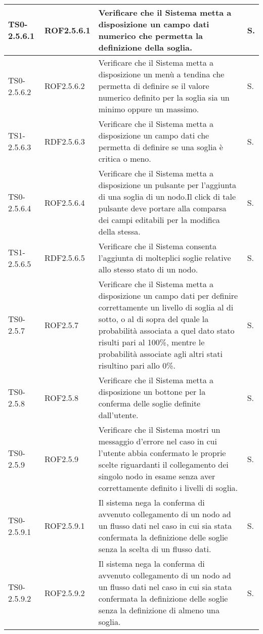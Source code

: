 \begin{longtable}{|C{.15\textwidth}|C{.14\textwidth}|m{.51\textwidth}|C{.08\textwidth}|}
\hline
{}TS0-2.5.6.1 & ROF2.5.6.1 & Verificare che il Sistema metta a disposizione un campo dati numerico che permetta la definizione della soglia. & S. \\ 
\hline
TS0-2.5.6.2 & ROF2.5.6.2 & Verificare che il Sistema metta a disposizione un menù a tendina che permetta di definire se il valore numerico definito per la soglia sia un minimo oppure un massimo. & S. \\
\hline
{}TS1-2.5.6.3 & RDF2.5.6.3  & Verificare che il Sistema metta a disposizione un campo dati che permetta di definire se una soglia è critica o meno.  & S. \\
\hline
TS0-2.5.6.4 & ROF2.5.6.4  & Verificare che il Sistema metta a disposizione un pulsante per l'aggiunta di una soglia di un nodo.Il click di tale pulsante deve portare alla comparsa dei campi editabili per la modifica della stessa. & S. \\
\hline
{}TS1-2.5.6.5 & RDF2.5.6.5  & Verificare che il Sistema consenta l'aggiunta di molteplici soglie relative allo stesso stato di un nodo. & S. \\
\hline
TS0-2.5.7 & ROF2.5.7 & Verificare che il Sistema metta a disposizione un campo dati per definire correttamente un livello di soglia al di sotto, o al di sopra del quale la probabilità associata a quel dato stato risulti pari al 100\%, mentre le probabilità associate agli altri stati risultino pari allo 0\%. & S. \\
\hline
{}TS0-2.5.8 & ROF2.5.8 & Verificare che il Sistema metta a disposizione un bottone per la conferma delle soglie definite dall'utente. & S. \\
\hline
TS0-2.5.9 & ROF2.5.9 & Verificare che il Sistema mostri un messaggio d'errore nel caso in cui l'utente abbia confermato le proprie scelte riguardanti il collegamento dei singolo nodo in esame senza aver correttamente definito i livelli di soglia. & S. \\
\hline
{}TS0-2.5.9.1 & ROF2.5.9.1 & Il sistema nega la conferma di avvenuto collegamento di un nodo ad un flusso dati nel caso in cui sia stata confermata la definizione delle soglie senza la scelta di un flusso dati. & S. \\
\hline
TS0-2.5.9.2 & ROF2.5.9.2  & Il sistema nega la conferma di avvenuto collegamento di un nodo ad un flusso dati nel caso in cui sia stata confermata la definizione delle soglie senza la definizione di almeno una soglia. & S. \\
\hline

\end{longtable}
